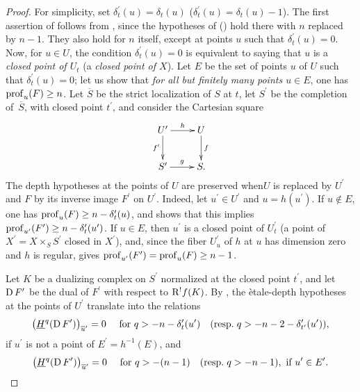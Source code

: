 \begin{proof}
For simplicity, set $\delta_{t}^{\prime}(u)=\delta_{t}(u)$ (\resp $\delta_{t}^{\prime}(u)=\delta_{t}(u)-1$). The first assertion of  follows from , since the hypotheses of  (\resp {}) hold there with $n$ replaced by $n-1$. They also hold for $n$ itself, except at points $u$ such that $\delta_{t}^{\prime}(u)=0$. Now, for $u\in U$, the condition $\delta_{t}^{\prime}(u)=0$ is equivalent to saying that $u$ is a \emph{closed point of $U_t$} (\resp a \emph{closed point of $X$}). Let $E$ be the set of points $u$ of $U$ such that $\delta_{t}^{\prime}(u)=0$; let us show that \emph{for all but finitely many points $u\in E$}, one has $\operatorname{prof}_{u}(F)\geq n$. Let $\overline{S}$ be the strict localization of $S$ at $t$, let $S^{\prime}$ be the completion of~$\overline{S}$, with closed point $t^{\prime}$, and consider the Cartesian square
$$
\xymatrix{ U^{\prime}\ar[r]^-{h}\ar[d]_-{f^{\prime}} & U\ar[d]^-{f}\\
S^{\prime}\ar[r]^-{g} & S.}$$
The depth hypotheses at the points of $U$ are preserved when\pageoriginale $U$ is replaced by $U^{\prime}$ and $F$ by its inverse image $F^{\prime}$ on $U^{\prime}$. Indeed, let $u^{\prime}\in U^{\prime}$ and $u=h(u^{\prime})$. If $u\not\in E$, one has $\operatorname{prof}_{u}(F)\geq n-\delta_{t}^{\prime}(u)$, and  shows that this implies $\operatorname{prof}_{u^{\prime}}(F^{\prime})\geq n-\delta_{t}^{\prime}(u^{\prime})$. If $u\in E$, then $u^{\prime}$ is a closed point of $U_{t}^{\prime}$ (\resp a point of $X^{\prime}=X\times_{S}S^{\prime}$ closed in $X^{\prime}$), and, since the fiber $U_{u}^{\prime}$ of $h$ at $u$ has dimension zero and $h$ is regular,  gives $\operatorname{prof}_{u^{\prime}}(F^{\prime})=\operatorname{prof}_{u}(F)\geq n-1$.

Let $K$ be a dualizing complex on $S^{\prime}$ normalized at the closed point $t^{\prime}$, and let $\operatorname{D} F^{\prime}$ be the dual of $F^{\prime}$ with respect to $\mathrm R^{!}f(K)$. By , the \`etale-depth hypotheses at the points of $U^{\prime}$ translate into the relations
$$
\big(\underline{H}^{q}(\operatorname{D} F^{\prime})\big)_{\overline{u}^{\prime}}=0\quad\textrm{ for }q>-n-\delta_{t}^{\prime}(u^{\prime})\quad(\textrm{resp.\kern.3em}q>-n-2-\delta_{t^{\prime}}^{\prime}(u^{\prime})),
$$
if $u^{\prime}$ is not a point of $E^{\prime}=h^{-1}(E)$, and
$$
\big(\underline{H}^{q}(\operatorname{D} F^{\prime})\big)_{\overline{u}^{\prime}}=0\quad\textrm{ for }q>-(n-1)\quad(\textrm{resp.\kern.3em}q>-n-1), \textrm{ if }u^{\prime}\in E^{\prime}.
$$


\end{proof}
